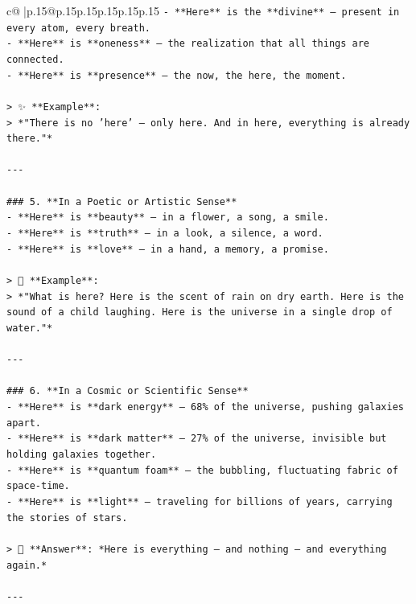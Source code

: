 \documentclass{article}
\begin{document}
{\begin{supertabular}{c@{$\;$}|p{.15\linewidth}@{}p{.15\linewidth}p{.15\linewidth}p{.15\linewidth}p{.15\linewidth}p{.15\linewidth}}
{{{\texttt{{-} **Here** is the **divine** — present in every atom, every breath.  } \\
\texttt{{-} **Here** is **oneness** — the realization that all things are connected.  } \\
\texttt{{-} **Here** is **presence** — the now, the here, the moment.} \\
\\ 
\texttt{> ✨ **Example**:  } \\
\texttt{> *"There is no 'here' — only here. And in here, everything is already there."*} \\
\\ 
\texttt{{-}{-}{-}} \\
\\ 
\texttt{\#\#\# 5. **In a Poetic or Artistic Sense**  } \\
\texttt{{-} **Here** is **beauty** — in a flower, a song, a smile.  } \\
\texttt{{-} **Here** is **truth** — in a look, a silence, a word.  } \\
\texttt{{-} **Here** is **love** — in a hand, a memory, a promise.} \\
\\ 
\texttt{> 🌸 **Example**:  } \\
\texttt{> *"What is here? Here is the scent of rain on dry earth. Here is the sound of a child laughing. Here is the universe in a single drop of water."*} \\
\\ 
\texttt{{-}{-}{-}} \\
\\ 
\texttt{\#\#\# 6. **In a Cosmic or Scientific Sense**  } \\
\texttt{{-} **Here** is **dark energy** — 68\% of the universe, pushing galaxies apart.  } \\
\texttt{{-} **Here** is **dark matter** — 27\% of the universe, invisible but holding galaxies together.  } \\
\texttt{{-} **Here** is **quantum foam** — the bubbling, fluctuating fabric of space{-}time.  } \\
\texttt{{-} **Here** is **light** — traveling for billions of years, carrying the stories of stars.} \\
\\ 
\texttt{> 🌌 **Answer**: *Here is everything — and nothing — and everything again.*} \\
\\ 
\texttt{{-}{-}{-}} \\
}}}
\end{supertabular}}
\end{document}
